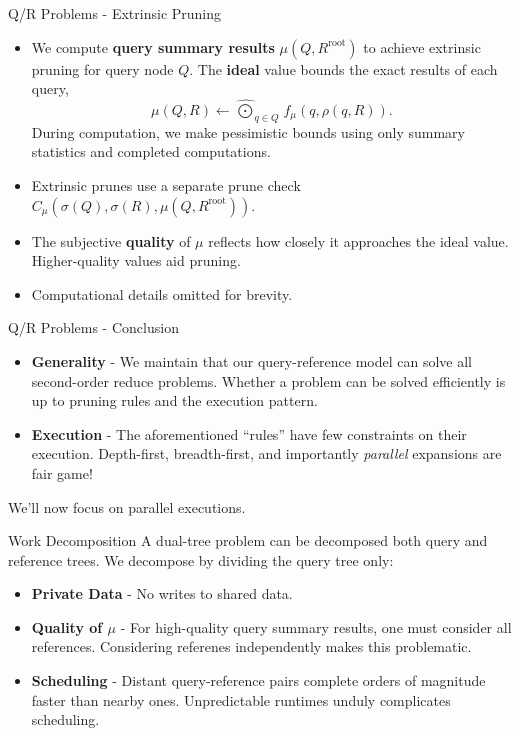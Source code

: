 \documentclass[pdf,colorBG,slideColor]{prosper}
\newcommand{\itemt}[1]{\item {\bf #1} -}
\newcommand{\defterm}[1]{{\bf #1}}
\newcommand{\kdroot}[1]{#1^{\text{root}}}
\newcommand{\nameOp}[2]{\mathop{#1\nolimits\!\!_{#2}}}
\newcommand{\inqr}{\rho}
\newcommand{\lettermu}{\mu}
\newcommand{\inmu}{\mu}
\newcommand{\Outopmu}{\widehat{\nameOp{\bigodot}{\lettermu}}}%
\newcommand{\fmu}{f_{\!\lettermu}}
\newcommand{\canprunemu}{C_{\!\lettermu}}
\newcommand{\outstat}{\sigma}
\begin{document}
\begin{slide}{Q/R Problems - Extrinsic Pruning}
  \begin{itemize}
    \item We compute \defterm{query summary results} $\inmu(Q, \kdroot{R})$
    to achieve extrinsic pruning for query node $Q$.
    The \defterm{ideal} value bounds the exact results of each query,
      \begin{equation*}
      \inmu(Q, R) \gets \Outopmu_{q \in Q} \fmu(q, \inqr(q, R)).
      \end{equation*}
    During computation, we make pessimistic bounds using only
    summary statistics and completed computations.
    \item Extrinsic prunes use a separate prune check $\canprunemu(\outstat(Q), \outstat(R), \inmu(Q, \kdroot{R}))$.
    \item The subjective \defterm{quality} of $\lettermu$ reflects how
    closely it approaches the ideal value.
    Higher-quality values aid pruning.
    \item Computational details omitted for brevity.
  \end{itemize}
\end{slide}

\begin{slide}{Q/R Problems - Conclusion}
  \begin{itemize}
    \itemt{Generality}
    We maintain that our query-reference model can solve all second-order reduce problems.
    Whether a problem can be solved efficiently is up to pruning rules and the execution pattern.
    \itemt{Execution}
    The aforementioned ``rules'' have few constraints on their execution.
    Depth-first, breadth-first, and importantly {\em parallel} expansions are fair game!
  \end{itemize}
  
  We'll now focus on parallel executions.
\end{slide}

\begin{slide}{Work Decomposition}
  A dual-tree problem can be decomposed both query and reference trees.
  We decompose by dividing the query tree only:
  \begin{itemize}
    \itemt{Private Data}
    No writes to shared data.
    \itemt{Quality of $\lettermu$}
    For high-quality query summary results, one must consider all references.
    Considering referenes independently makes this problematic.
    \itemt{Scheduling}
    Distant query-reference pairs complete orders of magnitude faster than
    nearby ones.
    Unpredictable runtimes unduly complicates scheduling.
  \end{itemize}
\end{slide}
\end{document}
